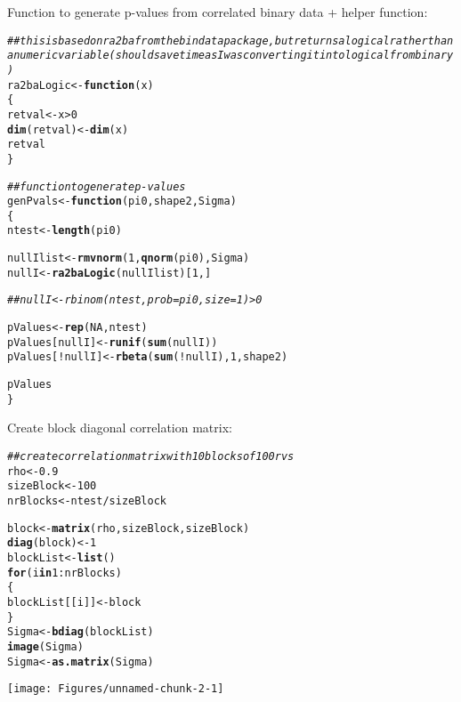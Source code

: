 \documentclass{article}\usepackage[]{graphicx}\usepackage[]{color}
\makeatletter
\def\maxwidth{ %
  \ifdim\Gin@nat@width>\linewidth
    \linewidth
  \else
    \Gin@nat@width
  \fi
}
\newcommand{\hlnum}[1]{\textcolor[rgb]{0.686,0.059,0.569}{#1}}%
\newcommand{\hlcom}[1]{\textcolor[rgb]{0.678,0.584,0.686}{\textit{#1}}}%
\newcommand{\hlopt}[1]{\textcolor[rgb]{0,0,0}{#1}}%
\newcommand{\hlstd}[1]{\textcolor[rgb]{0.345,0.345,0.345}{#1}}%
\newcommand{\hlkwa}[1]{\textcolor[rgb]{0.161,0.373,0.58}{\textbf{#1}}}%
\newcommand{\hlkwb}[1]{\textcolor[rgb]{0.69,0.353,0.396}{#1}}%
\newcommand{\hlkwc}[1]{\textcolor[rgb]{0.333,0.667,0.333}{#1}}%
\newcommand{\hlkwd}[1]{\textcolor[rgb]{0.737,0.353,0.396}{\textbf{#1}}}%
\newenvironment{kframe}{%
 \def\at@end@of@kframe{}%
 \ifinner\ifhmode%
  \def\at@end@of@kframe{\end{minipage}}%
  \begin{minipage}{\columnwidth}%
 \fi\fi%
 \def\FrameCommand##1{\hskip\@totalleftmargin \hskip-\fboxsep
 \colorbox{shadecolor}{##1}\hskip-\fboxsep
     \hskip-\linewidth \hskip-\@totalleftmargin \hskip\columnwidth}%
 \MakeFramed {\advance\hsize-\width
   \@totalleftmargin\z@ \linewidth\hsize
   \@setminipage}}%
 {\par\unskip\endMakeFramed%
 \at@end@of@kframe}
\newenvironment{knitrout}{}{} %
\makeatother
\begin{document}
Function to generate p-values from correlated binary data + helper function:
\begin{knitrout}
\color{fgcolor}\begin{kframe}
\begin{alltt}
\hlcom{##this is based on ra2ba from the bindata package, but returns a logical rather than a numeric variable (should save time as I was converting it into logical from binary)}
\hlstd{ra2baLogic} \hlkwb{<-} \hlkwa{function} \hlstd{(}\hlkwc{x}\hlstd{)}
\hlstd{\{}
  \hlstd{retval} \hlkwb{<-} \hlstd{x} \hlopt{>} \hlnum{0}
  \hlkwd{dim}\hlstd{(retval)} \hlkwb{<-} \hlkwd{dim}\hlstd{(x)}
  \hlstd{retval}
\hlstd{\}}

\hlcom{##function to generate p-values}
\hlstd{genPvals} \hlkwb{<-} \hlkwa{function}\hlstd{(}\hlkwc{pi0}\hlstd{,} \hlkwc{shape2}\hlstd{,} \hlkwc{Sigma}\hlstd{)}
\hlstd{\{}
  \hlstd{ntest} \hlkwb{<-} \hlkwd{length}\hlstd{(pi0)}

  \hlstd{nullIlist} \hlkwb{<-} \hlkwd{rmvnorm}\hlstd{(}\hlnum{1}\hlstd{,} \hlkwd{qnorm}\hlstd{(pi0), Sigma)}
  \hlstd{nullI} \hlkwb{<-} \hlkwd{ra2baLogic}\hlstd{(nullIlist)[}\hlnum{1}\hlstd{,]}

  \hlcom{##nullI <- rbinom(ntest,prob=pi0,size=1)> 0}

  \hlstd{pValues} \hlkwb{<-} \hlkwd{rep}\hlstd{(}\hlnum{NA}\hlstd{,ntest)}
  \hlstd{pValues[nullI]} \hlkwb{<-} \hlkwd{runif}\hlstd{(}\hlkwd{sum}\hlstd{(nullI))}
  \hlstd{pValues[}\hlopt{!}\hlstd{nullI]} \hlkwb{<-} \hlkwd{rbeta}\hlstd{(}\hlkwd{sum}\hlstd{(}\hlopt{!}\hlstd{nullI),}\hlnum{1}\hlstd{,shape2)}

  \hlstd{pValues}
\hlstd{\}}
\end{alltt}
\end{kframe}
\end{knitrout}

Create block diagonal correlation matrix:
\begin{knitrout}
\color{fgcolor}\begin{kframe}
\begin{alltt}
\hlcom{##create correlation matrix with 10 blocks of 100 rvs}
\hlstd{rho} \hlkwb{<-} \hlnum{0.9}
\hlstd{sizeBlock} \hlkwb{<-} \hlnum{100}
\hlstd{nrBlocks} \hlkwb{<-} \hlstd{ntest}\hlopt{/}\hlstd{sizeBlock}

\hlstd{block} \hlkwb{<-} \hlkwd{matrix}\hlstd{(rho, sizeBlock, sizeBlock)}
\hlkwd{diag}\hlstd{(block)} \hlkwb{<-} \hlnum{1}
\hlstd{blockList} \hlkwb{<-} \hlkwd{list}\hlstd{()}
\hlkwa{for}\hlstd{(i} \hlkwa{in} \hlnum{1}\hlopt{:}\hlstd{nrBlocks)}
\hlstd{\{}
  \hlstd{blockList[[i]]} \hlkwb{<-} \hlstd{block}
\hlstd{\}}
\hlstd{Sigma} \hlkwb{<-} \hlkwd{bdiag}\hlstd{(blockList)}
\hlkwd{image}\hlstd{(Sigma)}
\hlstd{Sigma} \hlkwb{<-} \hlkwd{as.matrix}\hlstd{(Sigma)}
\end{alltt}
\end{kframe}

{\centering \texttt{[image: Figures/unnamed-chunk-2-1]} 

}



\end{knitrout}
\end{document}
